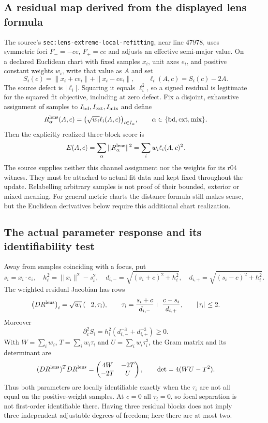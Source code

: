 \documentclass[11pt,a4paper]{article}
\begin{document}
\subsection{A residual map derived from the displayed lens formula}
The source's \texttt{sec:lens-extreme-local-refitting}, near line 47978,
uses symmetric foci $F_-=-ce$, $F_+=ce$ and adjusts an effective semi-major
value. On a declared Euclidean chart with fixed samples $x_i$, unit axes
$e_i$, and positive constant weights $w_i$, write that value as $A$ and set
\[
 S_i(c)=\|x_i+ce_i\|+\|x_i-ce_i\|,\qquad
 \ell_i(A,c)=S_i(c)-2A.
\]
The source defect is $|\ell_i|$. Squaring it equals $\ell_i^2$, so a
signed residual is legitimate for the squared fit objective, including
at zero defect. Fix a disjoint, exhaustive assignment of samples to
$I_{\rm bd},I_{\rm ext},I_{\rm mix}$ and define
\[
 R_{\alpha}^{\rm lens}(A,c)
 =\bigl(\sqrt{w_i}\ell_i(A,c)\bigr)_{i\in I_{\alpha}},
 \qquad \alpha\in\{{\rm bd},{\rm ext},{\rm mix}\}.
\]
Then the explicitly realized three-block score is
\[
 E(A,c)=\sum_\alpha\|R_\alpha^{\rm lens}\|^2
       =\sum_iw_i\ell_i(A,c)^2.
\]
The source supplies neither this channel assignment nor the weights for
its r04 witness. They must be attached to actual fit data and kept fixed
throughout the update. Relabelling arbitrary samples is not proof of their
bounded, exterior or mixed meaning. For general metric charts the distance
formula still makes sense, but the Euclidean derivatives below require
this additional chart realization.

\subsection{The actual parameter response and its identifiability test}
Away from samples coinciding with a focus, put
\[
 s_i=x_i\cdot e_i,\quad h_i^2=\|x_i\|^2-s_i^2,\quad
 d_{i,-}=\sqrt{(s_i+c)^2+h_i^2},\quad
 d_{i,+}=\sqrt{(s_i-c)^2+h_i^2}.
\]
The weighted residual Jacobian has rows
\[
 \bigl(DR^{\rm lens}\bigr)_i
 =\sqrt{w_i}\,(-2,\tau_i),\qquad
 \tau_i=\frac{s_i+c}{d_{i,-}}+\frac{c-s_i}{d_{i,+}},
 \qquad |\tau_i|\le2.
\]
Moreover
\[
 \partial_c^2 S_i
 =h_i^2(d_{i,-}^{-3}+d_{i,+}^{-3})\ge0.
\]
With $W=\sum_iw_i$, $T=\sum_iw_i\tau_i$ and
$U=\sum_iw_i\tau_i^2$, the Gram matrix and its determinant are
\[
 (DR^{\rm lens})^TDR^{\rm lens}
 =\begin{pmatrix}4W&-2T\\-2T&U\end{pmatrix},\qquad
 \det=4(WU-T^2).
\]
Thus both parameters are locally identifiable exactly when the
$\tau_i$ are not all equal on the positive-weight samples. At $c=0$
all $\tau_i=0$, so focal separation is not first-order identifiable
there. Having three residual blocks does not imply three independent
adjustable degrees of freedom; here there are at most two.
\end{document}
